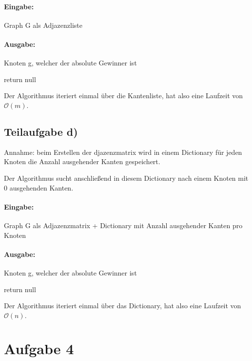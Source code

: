 \documentclass[12pt]{scrartcl}%
\theoremstyle{nonumberplain}
\newcommand{\bO}[1]{\mathcal O(#1)}
\begin{document}
\paragraph{Eingabe:} Graph G als Adjazenzliste

\paragraph{Ausgabe:} Knoten g, welcher der absolute Gewinner ist

\begin{algorithm}
	 {
	}
	return null\;
\end{algorithm}

Der Algorithmus iteriert einmal über die Kantenliste, hat also eine Laufzeit von $\bO{m}$.

\subsection*{Teilaufgabe d)}

Annahme: beim Erstellen der djazenzmatrix wird in einem Dictionary für jeden Knoten die Anzahl ausgehender Kanten gespeichert. 

Der Algorithmus sucht anschließend in diesem Dictionary nach einem Knoten mit 0 ausgehenden Kanten.

\paragraph{Eingabe:} Graph G als Adjazenzmatrix + Dictionary mit Anzahl ausgehender Kanten pro Knoten

\paragraph{Ausgabe:} Knoten g, welcher der absolute Gewinner ist

\begin{algorithm}
	 {
	}
	return null\;
\end{algorithm}

Der Algorithmus iteriert einmal über das Dictionary, hat also eine Laufzeit von $\bO{n}$.

\newpage

\section*{Aufgabe 4}
\end{document}
